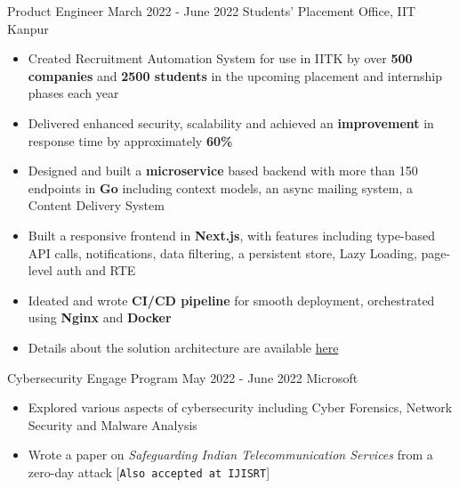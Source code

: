 \begin{cventries}
  
  \excventry
  {Product Engineer}
  {March 2022 - June 2022}
  {Students' Placement Office, IIT Kanpur}
  {
    \begin{itemize}
      \item Created Recruitment Automation System for use in IITK by over \textbf{500 companies} and \textbf{2500 students} in the upcoming placement and internship phases each year  
      \item Delivered enhanced security, scalability and achieved an \textbf{improvement} in response time by approximately \textbf{60\%}
      \item Designed and built a \textbf{microservice} based backend with more than 150 endpoints in \textbf{Go} including context models, an async mailing system, a Content Delivery System  
      \item Built a responsive frontend in \textbf{Next.js}, with features including type-based API calls, notifications, data filtering, a persistent store, Lazy Loading, page-level auth and RTE
      \item Ideated and wrote \textbf{CI/CD pipeline} for smooth deployment, orchestrated using \textbf{Nginx} and \textbf{Docker}
      \item Details about the solution architecture are available \href{https://abhishekshree.xyz/blog/engineering-ras}{here {\small \faExternalLink{}}}
    \end{itemize}
  }


  \excventry
  {Cybersecurity Engage Program}
  {May 2022 - June 2022}
  {Microsoft}
  {
    \begin{itemize}
      \item Explored various aspects of cybersecurity including Cyber Forensics, Network Security and Malware Analysis
      \item Wrote a paper on \textit{Safeguarding Indian Telecommunication Services} from a zero-day attack [\texttt{Also accepted at IJISRT}]
    \end{itemize}
  }
\end{cventries}

